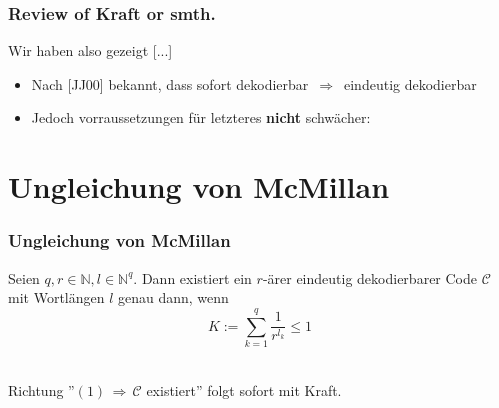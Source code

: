 \documentclass{beamer}
\begin{document}
\begin{frame}[t]
{{\begin{center}
            \end{center}
        }
    }
\end{frame}

\begin{frame}
    \frametitle{Review of Kraft or smth.}

    Wir haben also gezeigt [...]

    \begin{itemize}
        \item Nach [JJ00] bekannt, dass sofort dekodierbar $\,\Longrightarrow\,$ eindeutig
            dekodierbar
        \item Jedoch vorraussetzungen für letzteres \textbf{nicht} schwächer:
    \end{itemize}

\end{frame}

\section{Ungleichung von McMillan}

\begin{frame}[t]
    \frametitle{Ungleichung von McMillan}
    Seien $q,r \in \mathbb{N}, l \in \mathbb{N}^q$. Dann existiert ein $r$-ärer eindeutig dekodierbarer Code $\mathcal{C}$
    mit Wortlängen $l$ genau dann, wenn
    \begin{equation}
        K := \sum_{k=1}^{q} \frac{1}{r^{l_k}} \leq 1
    \end{equation}\\[20pt]
    \pause

    Richtung ''$(1) \,\Longrightarrow\, \mathcal{C}$ existiert'' folgt sofort mit Kraft.\\
\end{frame}
\end{document}

